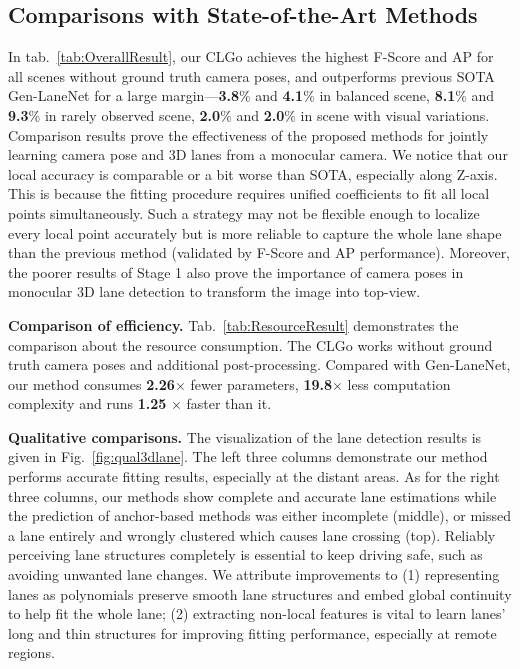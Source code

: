 \documentclass[letterpaper]{article} \usepackage{aaai22}  \usepackage{times}  \usepackage{helvet}  \usepackage{courier}  \usepackage[hyphens]{url}  \usepackage{graphicx} \urlstyle{rm} \def\UrlFont{\rm}  \usepackage{natbib}  \usepackage{caption}
\begin{document}
\subsection{Comparisons with State-of-the-Art Methods}
In tab.~\ref{tab:OverallResult}, our CLGo achieves the highest F-Score and AP for all scenes without ground truth camera poses, and outperforms previous SOTA Gen-LaneNet for a large margin---\textbf{3.8}\% and \textbf{4.1}\% in balanced scene, \textbf{8.1}\% and \textbf{9.3}\% in rarely observed scene, \textbf{2.0}\% and \textbf{2.0}\% in scene with visual variations. Comparison results prove the effectiveness of the proposed methods for jointly learning camera pose and 3D lanes from a monocular camera. 
We notice that our local accuracy is comparable or a bit worse than SOTA, especially along Z-axis. This is because the fitting procedure requires unified coefficients to fit all local points simultaneously. Such a strategy may not be flexible enough to localize every local point accurately but is more reliable to capture the whole lane shape than the previous method (validated by F-Score and AP performance). 
Moreover, the poorer results of Stage 1 also prove the importance of camera poses in monocular 3D lane detection to transform the image into top-view.  

\noindent \textbf{Comparison of efficiency.}
Tab.~\ref{tab:ResourceResult} demonstrates the comparison about the resource consumption. The CLGo works without ground truth camera poses and additional post-processing. Compared with Gen-LaneNet, our method consumes \textbf{2.26}$\times$ fewer parameters, \textbf{19.8}$\times$ less computation complexity and runs \textbf{1.25} $\times$ faster than it.


\noindent \textbf{Qualitative comparisons.}
The visualization of the lane detection results is given in Fig.~\ref{fig:qual3dlane}. The left three columns demonstrate our method performs accurate fitting results, especially at the distant areas. As for the right three columns, our methods show complete and accurate lane estimations while the prediction of anchor-based methods was either incomplete (middle), or missed a lane entirely and wrongly clustered which causes lane crossing (top). Reliably perceiving lane structures completely is essential to keep driving safe, such as avoiding unwanted lane changes. We attribute improvements to (1) representing lanes as polynomials preserve smooth lane structures and embed global continuity to help fit the whole lane; (2) extracting non-local features is vital to learn lanes' long and thin structures for improving fitting performance, especially at remote regions.
\end{document}

